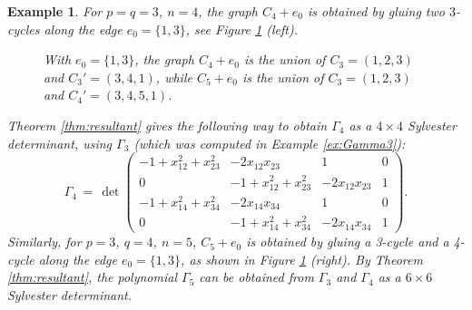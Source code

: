 \documentclass[a4paper, 11pt, twoside]{article}
\theoremstyle{plain}
\newtheorem{example}[theorem]{Example}
\begin{document}
\begin{example}\label{ex:Gamma4}
For $p = q = 3$,  $n = 4$,
the graph $C_4+e_0$ is obtained by gluing two $3$-cycles along the edge $e_0 = \{1,3\}$, see Figure \ref{fig:cycle+cord} (left). 
\begin{figure}[ht]
    \centering
    \noindent{}
    \caption{With $e_0=\{1,3\}$, the graph $C_4+e_0$ is the union of $C_3=(1,2,3)$ and $C_3'=(3,4,1)$, while $C_5+e_0$ is the union of $C_3=(1,2,3)$ and $C_4'=(3,4,5,1)$.}
    \label{fig:cycle+cord}
    \end{figure}
    Theorem \ref{thm:resultant} gives the following way to 
    obtain  $\Gamma_4$ as a $4 \times 4$ Sylvester determinant, using $\Gamma_3$ (which was computed in Example \ref{ex:Gamma3}):
    \[ \Gamma_4 \, = \, \det \begin{pmatrix}
    -1 + x_{12}^2 + x_{23}^2 & -2 x_{12}x_{23} & 1 & 0 \\ 
    0 & -1 + x_{12}^2 + x_{23}^2 & -2 x_{12}x_{23} & 1 \\ 
    -1 + x_{14}^2 + x_{34}^2 & -2 x_{14}x_{34} & 1 & 0 \\ 
    0 &  -1 + x_{14}^2 + x_{34}^2 & -2 x_{14}x_{34} & 1
    \end{pmatrix} .\]
    Similarly, for $p=3$, $q=4$, $n=5$, $C_5+e_0$ is obtained by gluing a 3-cycle and a 4-cycle along the edge $e_0=\{1,3\}$, as shown in Figure \ref{fig:cycle+cord} (right). By Theorem \ref{thm:resultant},     the polynomial $\Gamma_5$ can be obtained from $\Gamma_3$ and $\Gamma_4$  as a $6 \times 6$ Sylvester determinant.
\end{example}
\end{document}
